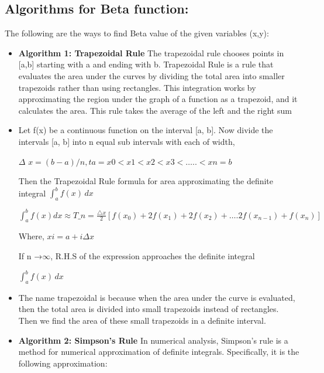 \documentclass[letterpaper, 11pt]{article}
\begin{document}
    \subsection{Algorithms for Beta function:}
    The following are the ways to find Beta value of the given variables (x,y):
        \begin{itemize}
            \item \textbf{Algorithm 1: Trapezoidal Rule} 
                The trapezoidal rule chooses points in [a,b] starting with a and ending with b. Trapezoidal Rule is a rule that evaluates the area under the curves by dividing the total area into smaller trapezoids rather than using rectangles. This integration works by approximating the region under the graph of a function as a trapezoid, and it calculates the area. This rule takes the average of the left and the right sum \cite{trapezoidal2}
                \item Let f(x) be a continuous function on the interval [a, b]. Now divide the intervals [a, b] into n equal sub intervals with each of width,
                
                ${\Delta}$ $x = (b-a)/n, t a = x0 < x1< x2< x3<…..<xn = b$
                
                Then the Trapezoidal Rule formula for area approximating the definite integral
                \(\int_{a}^{b}f(x)\,dx\)
                
                \(\int_{a}^{b}f(x)dx\approx T\_{n}=\frac{\bigtriangleup x}{2}[f(x_{0})+ 2f(x_{1})+2f(x_{2})+….2f(x_{n-1})+f(x_{n})]\)
                
                Where, $xi = a+i{\Delta}x$
                
                If n →$\infty$, R.H.S of the expression approaches the definite integral
                \begin{center}
                    \(\int_{a}^{b}f(x)\,dx\)    
                \end{center}
                
                \item
                The name trapezoidal is because when the area under the curve is evaluated, then the total area is divided into small trapezoids instead of rectangles. Then we find the area of these small trapezoids in a definite interval.
                
                \item \textbf{Algorithm 2: Simpson's Rule}  
                In numerical analysis, Simpson’s rule is a method for numerical approximation of definite integrals. Specifically, it is the following approximation: 


\end{itemize}
\end{document}
